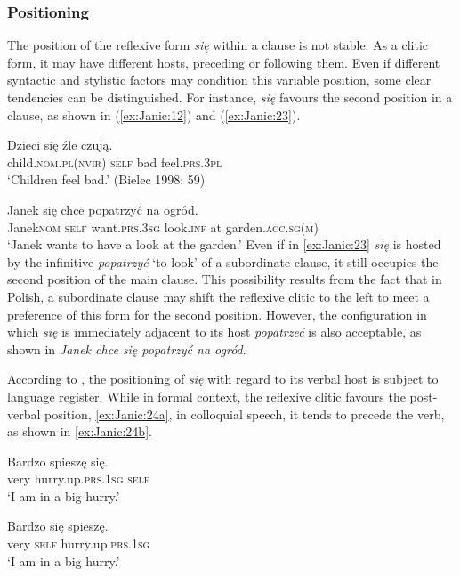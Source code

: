 \documentclass[output=paper]{langscibook}
\begin{document}
\subsubsection{Positioning} \label{sec:Janic:3.2.3}

The position of the reflexive form \textit{się} within a clause is not stable. As a clitic form, it may have different hosts, preceding or following them. Even if different syntactic and stylistic factors may condition this variable position, some clear tendencies can be distinguished. For instance, \textit{się} favours the second position in a clause, as shown in (\ref{ex:Janic:12}) and (\ref{ex:Janic:23}).

\ea \label{ex:ch:11:22}
\gll Dzieci			 się	 źle		czują.\\
	 child.\textsc{nom.pl(nvir)}	\textsc{self}	bad 	feel.\textsc{prs.3pl}\\		
\glt ‘Children feel bad.’ (Bielec 1998: 59)
\z 

\ea \label{ex:Janic:23}
\gll Janek 	się	 chce	 popatrzyć	 na	ogród.\\
 	Janek\textsc{nom}	\textsc{self}	want.\textsc{prs.3sg} 	look.\textsc{inf} 	at	garden.\textsc{acc.sg(m)}\\
\glt ‘Janek wants to have a look at the garden.’ \citep[391]{SussexCubberley2006}
\z 	
Even if in \ref{ex:Janic:23} \textit{się} is hosted by the infinitive \textit{popatrzyć} ‘to look’ of a subordinate clause, it still occupies the second position of the main clause. This possibility results from the fact that in Polish, a subordinate clause may shift the reflexive clitic to the left to meet a preference of this form for the second position. However, the configuration in which \textit{się} is immediately adjacent to its host \textit{popatrzeć} is also acceptable, as shown in \textit{Janek chce się popatrzyć na ogród}.

According to \citet{Swan2003}, the positioning of \textit{się} with regard to its verbal host is subject to language register. While in formal context, the reflexive clitic favours the post-verbal position, \ref{ex:Janic:24a}, in colloquial speech, it tends to precede the verb, as shown in \ref{ex:Janic:24b}.

\ea \label{ex:Janic:24}
\ea \label{ex:Janic:24a}
\gll Bardzo		spieszę	 się.\\
		very	 hurry.up.\textsc{prs.1sg}	\textsc{self}\\
\glt ‘I am in a big hurry.’
		
\ex \label{ex:Janic:24b}
\gll Bardzo	się	 spieszę.\\
		very	\textsc{self} 	hurry.up.\textsc{prs.1sg}\\	
\glt ‘I am in a big hurry.’		
\z 
\z 
\end{document}
